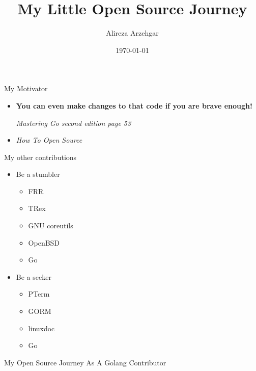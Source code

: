 \documentclass[xcolor={rgb}]{beamer}
\author{Alireza Arzehgar}
\title{My Little Open Source Journey}
\date{\today}
\newcommand{\pitem}{\pause\item}
\begin{document}
	\begin{frame}[plain]
		\titlepage
	\end{frame}

	\begin{frame}{My Motivator}
	\begin{itemize}
		\pitem
		\textbf{You can even make changes to that code if you are brave enough!}

		\textit{Mastering Go second edition page 53}

		\pitem
		\textit{How To Open Source}
	\end{itemize}
	\end{frame}

	\begin{frame}{My other contributions}
	\begin{itemize}
		\pitem Be a stumbler
		\begin{itemize}
			\pitem FRR
			\pitem TRex
			\pitem GNU coreutils
			\pitem OpenBSD
			\pitem Go
		\end{itemize}	
		\pitem Be a seeker
		\begin{itemize}
			\pitem PTerm
			\pitem GORM
			\pitem linuxdoc
			\pitem Go
		\end{itemize}	
	\end{itemize}
	\end{frame}

	\begin{frame}
	\begin{center}
		\Huge My Open Source Journey As A Golang Contributor
	\end{center}	
	\end{frame}
\end{document}
